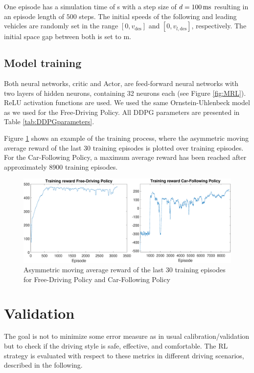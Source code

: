 \documentclass[review]{elsarticle}
\providecommand{\sub}[1]{_{\mathrm{#1}}}  %
\providecommand{\3}{{\ss}}
\begin{document}
One episode has a simulation time of \unit[50]{s} with a step size of
$d=\unit[100]{ms}$ resulting in an episode length of $500$
steps. The initial speeds of the following and leading vehicles are
randomly set in the range $[0,v\sub{des}]$ and $[0,v_{l,\text{des}}]$,
respectively. The initial space gap between both is set to \unit[120]{m}. 

\subsection{Model training}
Both neural networks, critic and Actor, are feed-forward neural networks with two layers of hidden neurons, containing 32 neurons each (see Figure \ref{fig:MRL}). ReLU activation functions are used. We used the same Ornstein-Uhlenbeck model as we used for the Free-Driving Policy.
All DDPG parameters are presented in Table \ref{tab:DDPGparameters}.

Figure \ref{fig:TrainingReward} shows an example of the training
process, where the asymmetric moving average reward of the last 30 training episodes is plotted over training episodes. For the Car-Following Policy, a maximum average reward has been reached after approximately 8900 training episodes.  
%
\begin{figure}
	\centering
	\includegraphics[width=12cm]{images/TrainingReward}
	\caption{Asymmetric moving average reward of the last 30 training episodes for Free-Driving Policy and Car-Following Policy} 
	\label{fig:TrainingReward}
\end{figure}








\section{Validation}

The goal is not to minimize some error measure as in usual
calibration/validation but to check if the driving style is safe,
effective, and comfortable. The RL strategy is evaluated with respect to these metrics in different driving scenarios, described in the following.
\end{document}
